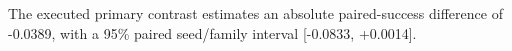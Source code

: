 The executed primary contrast estimates an absolute paired-success difference of -0.0389, with a 95\% paired seed/family interval [-0.0833, +0.0014]. 
